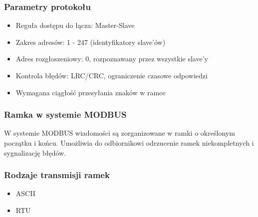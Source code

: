 		\subsubsection{Parametry protokołu}
			\begin{itemize}
				\item Reguła dostępu do łącza: Master-Slave
				\item Zakres adresów: 1 - 247 (identyfikatory slave'ów)
				\item Adres rozgłoszeniowy: 0, rozpoznawany przez wszystkie slave'y
				\item Kontrola błędów: LRC/CRC, ograniczenie czasowe odpowiedzi
				\item Wymagana ciągłość przesyłania znaków w ramce
			\end{itemize}
		\subsubsection{Ramka w systemie MODBUS}
			W systemie MODBUS wiadomości są zorganizowane w ramki o określonym początku i końcu. Umożliwia do odbiornikowi odrzucenie ramek niekompletnych i sygnalizację błędów.
		\subsubsection{Rodzaje transmisji ramek}
			\begin{itemize}
				\item ASCII
				\item RTU
			\end{itemize}
